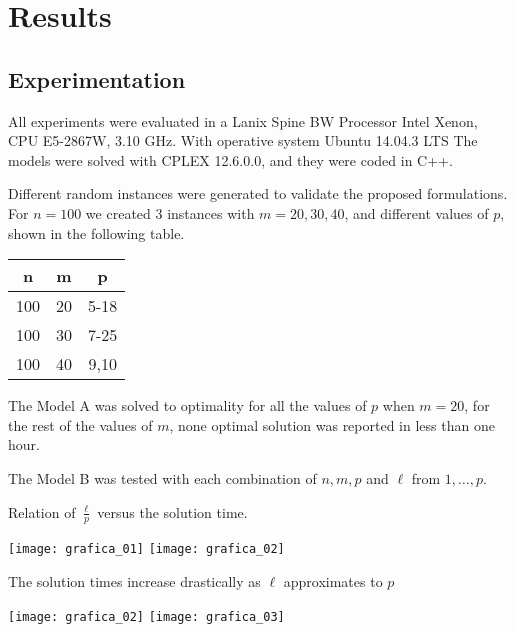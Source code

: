 
\section{Results}
\subsection{Experimentation}
\begin{frame}
  All experiments were evaluated in a Lanix Spine BW
  Processor Intel Xenon, CPU E5-2867W, 3.10 GHz.
  With operative system Ubuntu 14.04.3 LTS
  The models were solved with CPLEX 12.6.0.0,
  and they were coded in C++.
\end{frame}

\begin{frame}
  Different random instances were generated
  to validate the proposed formulations.
  For $n = 100$ we created 3 instances with $m = 20,30,40$,
  and different values of $p$, shown in the following table.
  \begin{table}
    \centerign
    \begin{tabular}{|c|c|c|}\hline
      n & m & p \\ \hline
      100 & 20 & 5-18 \\
      100 & 30 & 7-25 \\
      100 & 40 & 9,10 \\
      \hline
    \end{tabular}
  \end{table}
  
  The Model A was solved to optimality for all the values of $p$ when $m = 20$,
  for the rest of the values of $m$, none optimal solution was reported in less than one hour.

  The Model B was tested with each combination of $n,m,p$ and $\ell$ from $1,\ldots,p$.

\end{frame}

\begin{frame}
  Relation of $\frac{\ell}{p}$ versus the solution time.
  \begin{center}
    \texttt{[image: grafica\_01]}
    \texttt{[image: grafica\_02]}
  \end{center}
\end{frame}

\begin{frame}

  The solution times increase drastically as $\ell$ approximates to $p$
  
  \begin{center}
    \texttt{[image: grafica\_02]}
    \texttt{[image: grafica\_03]}
  \end{center}
  
\end{frame}


